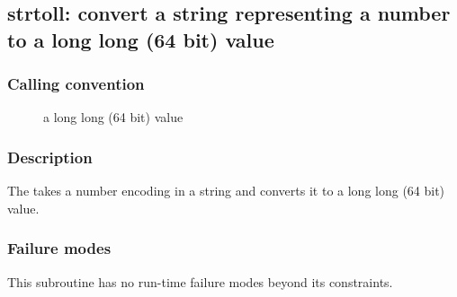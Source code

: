 \clearpage
{}
{}
\label{subr:strtoll}
\subsection*{strtoll: convert a string representing a number to a
  long long (64 bit) value}

\subsubsection*{Calling convention}

\begin{description}
\item[] a long long (64 bit) value
\end{description}

\subsubsection*{Description}

The  takes a number encoding in a string and
converts it to a long long (64 bit) value.

\subsubsection*{Failure modes}

This subroutine has no run-time failure modes beyond its constraints.
